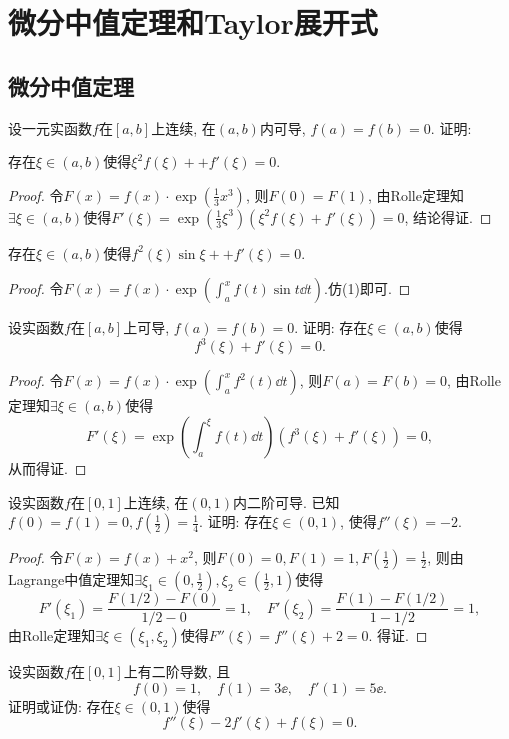 \chapter{微分中值定理和Taylor展开式}
\section{微分中值定理}
\begin{quiza}
\woe 设一元实函数\(f\)在\([a,b]\)上连续, 在\((a,b)\)内可导, \(f(a)=f(b)=0\). 证明:
\begin{quizs}
\item 存在\(\xi\in(a,b)\)使得\(\xi^2f(\xi)++f'(\xi)=0\).
\begin{proof}
令\(F(x)=f(x)\cdot\exp\left(\frac{1}{3}x^3\right)\), 则\(F(0)=F(1)\), 由Rolle定理知\(\exists \xi\in(a,b)\)使得\(F'(\xi)=\exp\left(\frac{1}{3}\xi^3\right)\left(\xi^2f(\xi)+f'(\xi)\right)=0\), 结论得证.
\end{proof}
\item 存在\(\xi\in(a,b)\)使得\(f^2(\xi)\sin\xi++f'(\xi)=0\).
\begin{proof}
令\(F(x)=f(x)\cdot\exp\left(\int_a^x f(t)\sin t\dd t\right).\)仿(1)即可.
\end{proof}
\end{quizs}
\woe 设实函数\(f\)在\([a,b]\)上可导, \(f(a)=f(b)=0\). 证明: 存在\(\xi\in(a,b)\)使得\[f^3(\xi)+f'(\xi)=0.\]
\begin{proof}
令\(F(x)=f(x)\cdot\exp\left(\int_a^x f^2(t)\dd t\right)\), 则\(F(a)=F(b)=0\), 由Rolle定理知\(\exists \xi\in(a,b)\)使得\[F'(\xi)=\exp\left(\int_a^\xi f(t)\dd t\right)\left(f^3(\xi)+f'(\xi)\right)=0,\]从而得证.
\end{proof}
\woe 设实函数\(f\)在\([0,1]\)上连续, 在\((0,1)\)内二阶可导. 已知\(f(0)=f(1)=0,f\left(\frac{1}{2}\right)=\frac{1}{4}.\) 证明: 存在\(\xi\in(0,1)\), 使得\(f''(\xi)=-2\).
\begin{proof}
令\(F(x)=f(x)+x^2\), 则\(F(0)=0,F(1)=1,F\left(\frac{1}{2}\right)=\frac{1}{2}\), 则由Lagrange中值定理知\(\exists\xi_1\in \left(0,\frac{1}{2}\right),\xi_2\in\left(\frac{1}{2},1\right)\)使得\[F'(\xi_1)=\frac{F\left(1/2\right)-F(0)}{1/2-0}=1,\quad F'(\xi_2)=\frac{F(1)-F\left(1/2\right)}{1-1/2}=1,\]由Rolle定理知\(\exists\xi\in(\xi_1,\xi_2)\)使得\(F''(\xi)=f''(\xi)+2=0\). 得证.
\end{proof}
\woe 设实函数\(f\)在\([0,1]\)上有二阶导数, 且\[f(0)=1,\quad f(1)=3\ee,\quad f'(1)=5\ee.\]证明或证伪: 存在\(\xi\in(0,1)\)使得\[f''(\xi)-2f'(\xi)+f(\xi)=0.\]

\end{quiza}
